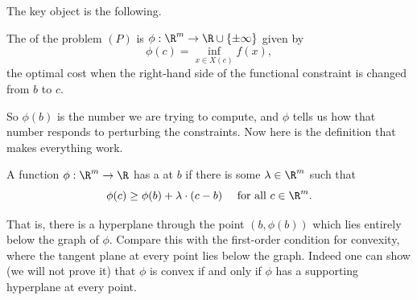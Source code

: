 The key object is the following.

\begin{definition}
    The  of the problem $(P)$ is $\phi : \R^m \rightarrow \R \cup \{\pm\infty\}$ given by
    $$
    \phi(c) = \inf_{x \in X(c)}f(x),
    $$
    the optimal cost when the right-hand side of the functional constraint is changed from $b$ to $c$.
\end{definition}

So $\phi(b)$ is the number we are trying to compute, and $\phi$ tells us how that number responds to perturbing the constraints. Now here is the definition that makes everything work.

\begin{definition}
    A function $\phi : \R^m \rightarrow \R$ has a  at $b$ if there is some $\lambda \in \R^m$ such that
    $$
    \phi(c) \geq \phi(b) + \lambda\cdot(c - b) \quad\text{ for all } c \in \R^m.
    $$
\end{definition}

That is, there is a hyperplane through the point $(b, \phi(b))$ which lies entirely below the graph of $\phi$. Compare this with the first-order condition for convexity, where the tangent plane at every point lies below the graph. Indeed one can show (we will not prove it) that $\phi$ is convex if and only if $\phi$ has a supporting hyperplane at every point.

\begin{center}
\end{center}

